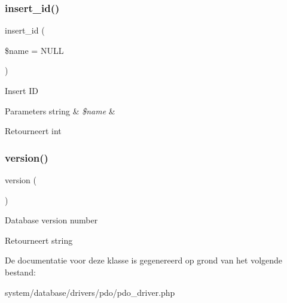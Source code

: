 \subsubsection{\texorpdfstring{insert\_id()}{insert\_id()}}
{\footnotesize\ttfamily insert\+\_\+id (\begin{DoxyParamCaption}\item[{}]{\$name = {\ttfamily NULL} }\end{DoxyParamCaption})}

Insert ID


\begin{DoxyParams}[1]{Parameters}
string & {\em \$name} & \\
\hline
\end{DoxyParams}
\begin{DoxyReturn}{Retourneert}
int 
\end{DoxyReturn}
\mbox{\label{class_c_i___d_b__pdo__driver_a6080dae0886626b9a4cedb29240708b1}} 
\subsubsection{\texorpdfstring{version()}{version()}}
{\footnotesize\ttfamily version (\begin{DoxyParamCaption}{ }\end{DoxyParamCaption})}

Database version number

\begin{DoxyReturn}{Retourneert}
string 
\end{DoxyReturn}


De documentatie voor deze klasse is gegenereerd op grond van het volgende bestand\+:\begin{DoxyCompactItemize}
\item 
system/database/drivers/pdo/pdo\+\_\+driver.\+php\end{DoxyCompactItemize}
